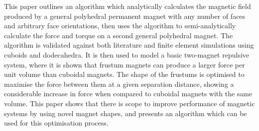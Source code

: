 This paper outlines an algorithm which analytically calculates the magnetic field produced by a general polyhedral permanent magnet with any number of faces and arbitrary face orientations, then uses the algorithm to \mbox{semi-analytically} calculate the force and torque on a second general polyhedral magnet. The algorithm is validated against both literature and finite element simulations using cuboids and dodecahedra. It is then used to model a basic two-magnet repulsive system, where it is shown that frustum magnets can produce a larger force per unit volume than cuboidal magnets. The shape of the frustums is optimised to maximise the force between them at a given separation distance, showing a considerable increase in force when compared to cuboidal magnets with the same volume. This paper shows that there is scope to improve performance of magnetic systems by using novel magnet shapes, and presents an algorithm which can be used for this optimisation process.